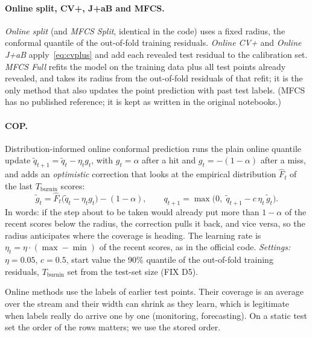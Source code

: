 \documentclass[11pt]{article}
\begin{document}
\paragraph{Online split, CV+, J+aB and MFCS.} \emph{Online split} (and \emph{MFCS Split}, identical in the code) uses a fixed
radius, the conformal quantile of the out-of-fold training residuals. \emph{Online CV+} and \emph{Online J+aB} apply~\eqref{eq:cvplus}
and add each revealed test residual to the calibration set. \emph{MFCS Full} refits the model on the training data plus all test
points already revealed, and takes its radius from the out-of-fold residuals of that refit; it is the only method that also
updates the point prediction with past test labels. (MFCS has no published reference; it is kept as written in the original
notebooks.)

\paragraph{COP.} Distribution-informed online conformal prediction \cite{hu2026cop} runs the plain online quantile update
$\tilde q_{t+1}=\tilde q_t-\eta_t g_t$, with $g_t=\alpha$ after a hit and $g_t=-(1-\alpha)$ after a miss, and adds an
\emph{optimistic} correction that looks at the empirical distribution $\hat F_t$ of the last $T_{\text{burnin}}$ scores:
\begin{equation}
\tilde g_t=\hat F_t\big(\tilde q_t-\eta_tg_t\big)-(1-\alpha),\qquad q_{t+1}=\max\big(0,\;\tilde q_{t+1}-c\,\eta_t\,\tilde g_t\big).
\end{equation}
In words: if the step about to be taken would already put more than $1-\alpha$ of the recent scores below the radius, the
correction pulls it back, and vice versa, so the radius anticipates where the coverage is heading. The learning rate is
$\eta_t=\eta\cdot(\max-\min)$ of the recent scores, as in the official code. \emph{Settings:} $\eta=0.05$, $c=0.5$, start value the
90\% quantile of the out-of-fold training residuals, $T_{\text{burnin}}$ set from the test-set size (FIX D5).

\begin{insight}
Online methods use the labels of earlier test points. Their coverage is an average over the stream and their width can
shrink as they learn, which is legitimate when labels really do arrive one by one (monitoring, forecasting). On a static test set
the order of the rows matters; we use the stored order.
\end{insight}
\end{document}
